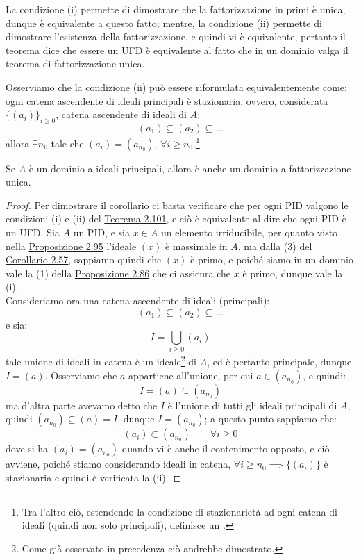 \documentclass[11pt]{scrartcl}
\begin{document}
\begin{remark}
    La condizione (i) permette di dimostrare che la fattorizzazione in primi è unica, dunque è equivalente a questo fatto; mentre, la condizione (ii) 
    permette di dimostrare l'esistenza della fattorizzazione, e quindi vi è equivalente, pertanto il teorema dice che essere un UFD è equivalente al 
    fatto che in un dominio valga il teorema di fattorizzazione unica.
\end{remark}

\begin{remark}
    Osserviamo che la condizione (ii) può essere riformulata equivalentemente come: ogni catena ascendente di ideali principali è stazionaria, ovvero,
    considerata $\{(a_i)\}_{i \geq 0}$, catena  ascendente di ideali di $A$:
    \[ (a_1) \subseteq (a_2) \subseteq \ldots
        \]
    allora $\exists n_0$ tale che $(a_i) = (a_{n_0})$, $\forall i \geq n_0$.\footnote{Tra l'altro ciò, estendendo la condizione di stazionarietà ad ogni catena di ideali (quindi non solo principali), definisce un .}
\end{remark}

\begin{corollary}
    Se $A$ è un dominio a ideali principali, allora è anche un dominio a fattorizzazione unica.
\end{corollary}

\begin{proof}
    Per dimostrare il corollario ci basta verificare che per ogni PID valgono le condizioni (i) e (ii) del \hyperref[2.101]{Teorema 2.101}, e ciò è equivalente al dire che ogni PID è un UFD.
    Sia $A$ un PID, e sia $x \in A$ un elemento irriducibile, per quanto visto nella \hyperref[2.95]{Proposizione 2.95} l'ideale $(x)$ è massimale in $A$, ma dalla (3) del \hyperref[2.57]{Corollario 2.57}, sappiamo quindi che 
    $(x)$ è primo, e poiché siamo in un dominio vale la (1) della \hyperref[2.86]{Proposizione 2.86} che ci assicura che $x$ è primo, dunque vale la (i).\\
    Consideriamo ora una catena ascendente di ideali (principali):
    \[ (a_1) \subseteq (a_2) \subseteq \ldots
        \]
    e sia:
    \[ I = \bigcup_{i \geq 0} (a_i)
        \]
    tale unione di ideali in catena è un ideale\footnote{Come già osservato in precedenza ciò andrebbe dimostrato.} di $A$, ed è pertanto principale, dunque $I = (a)$.
    Osserviamo che $a$ appartiene all'unione, per cui $a \in (a_{n_0})$, e quindi:
    \[ I = (a) \subseteq (a_{n_0})
        \]
    ma d'altra parte avevamo detto che $I$ è l'unione di tutti gli ideali principali di $A$, quindi $(a_{n_0}) \subseteq (a) = I $, dunque $I = (a_{n_0})$; a questo punto sappiamo che:
    \[ (a_i) \subset (a_{n_0}) \qquad \forall i \geq 0
        \]
    dove si ha $(a_i) = (a_{n_0})$ quando vi è anche il contenimento opposto, e ciò avviene, poiché stiamo considerando ideali in catena, $\forall i \geq n_0 \implies \{(a_i)\}$ è stazionaria e quindi è verificata la (ii).
\end{proof}
\end{document}
